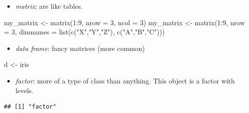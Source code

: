\documentclass[
]{book}
\newenvironment{Shaded}{\begin{snugshade}}{\end{snugshade}}
\newcommand{\AttributeTok}[1]{\textcolor[rgb]{0.77,0.63,0.00}{#1}}
\newcommand{\DecValTok}[1]{\textcolor[rgb]{0.00,0.00,0.81}{#1}}
\newcommand{\FunctionTok}[1]{\textcolor[rgb]{0.00,0.00,0.00}{#1}}
\newcommand{\NormalTok}[1]{#1}
\newcommand{\OtherTok}[1]{\textcolor[rgb]{0.56,0.35,0.01}{#1}}
\newcommand{\SpecialCharTok}[1]{\textcolor[rgb]{0.00,0.00,0.00}{#1}}
\newcommand{\StringTok}[1]{\textcolor[rgb]{0.31,0.60,0.02}{#1}}
\providecommand{\tightlist}{%
  \setlength{\itemsep}{0pt}\setlength{\parskip}{0pt}}
\begin{document}
\begin{itemize}
\tightlist
\item
  \emph{matrix}: are like tables.
\end{itemize}

\begin{Shaded}
\begin{Highlighting}[]
\NormalTok{my\_matrix }\OtherTok{\textless{}{-}} \FunctionTok{matrix}\NormalTok{(}\DecValTok{1}\SpecialCharTok{:}\DecValTok{9}\NormalTok{, }\AttributeTok{nrow =} \DecValTok{3}\NormalTok{, }\AttributeTok{ncol =} \DecValTok{3}\NormalTok{)}
\NormalTok{my\_matrix }\OtherTok{\textless{}{-}} \FunctionTok{matrix}\NormalTok{(}\DecValTok{1}\SpecialCharTok{:}\DecValTok{9}\NormalTok{, }\AttributeTok{nrow =} \DecValTok{3}\NormalTok{, }\AttributeTok{dimnames =} \FunctionTok{list}\NormalTok{(}\FunctionTok{c}\NormalTok{(}\StringTok{"X"}\NormalTok{,}\StringTok{"Y"}\NormalTok{,}\StringTok{"Z"}\NormalTok{), }\FunctionTok{c}\NormalTok{(}\StringTok{"A"}\NormalTok{,}\StringTok{"B"}\NormalTok{,}\StringTok{"C"}\NormalTok{)))}
\end{Highlighting}
\end{Shaded}

\begin{itemize}
\tightlist
\item
  \emph{data frame}: fancy matrices (more common)
\end{itemize}

\begin{Shaded}
\begin{Highlighting}[]
\NormalTok{d }\OtherTok{\textless{}{-}}\NormalTok{ iris}
\end{Highlighting}
\end{Shaded}

\begin{itemize}
\tightlist
\item
  \emph{factor}: more of a type of class than anything. This object is a factor with levels.
\end{itemize}

\begin{Shaded}
\end{Shaded}

\begin{verbatim}
## [1] "factor"
\end{verbatim}
\end{document}
